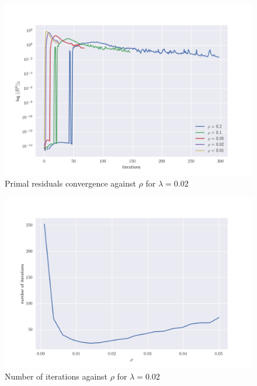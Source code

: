 \begin{figure}[H]
	\centering
	\includegraphics[width=\textwidth]{figures/convergence_rho.png}
	\caption{Primal residuals convergence against $\rho$ for $\lambda = 0.02$}
	\label{fig:convrho}
\end{figure}


\begin{figure}[H]
	\centering
	\includegraphics[width=\textwidth]{figures/rho_iter.png}
	\caption{Number of iterations against  $\rho$ for $\lambda = 0.02$}
	\label{fig:rhoiters}
\end{figure}
